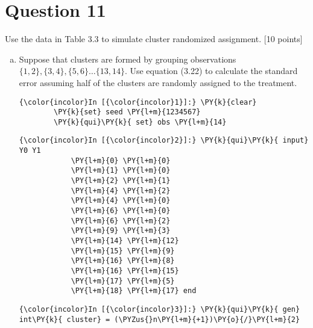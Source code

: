 \documentclass[11pt,notitlepage]{article}\usepackage[]{graphicx}\usepackage[]{color}
\makeatletter
\newenvironment{kframe}{%
 \def\at@end@of@kframe{}%
 \ifinner\ifhmode%
  \def\at@end@of@kframe{\end{minipage}}%
  \begin{minipage}{\columnwidth}%
 \fi\fi%
 \def\FrameCommand##1{\hskip\@totalleftmargin \hskip-\fboxsep
 \colorbox{shadecolor}{##1}\hskip-\fboxsep
     \hskip-\linewidth \hskip-\@totalleftmargin \hskip\columnwidth}%
 \MakeFramed {\advance\hsize-\width
   \@totalleftmargin\z@ \linewidth\hsize
   \@setminipage}}%
 {\par\unskip\endMakeFramed%
 \at@end@of@kframe}
\newenvironment{knitrout}{}{} %
\makeatother
\begin{document}
\section*{Question 11}

Use the data in Table 3.3 to simulate cluster randomized assignment. [10 points]

\begin{enumerate}[a)]
\item Suppose that clusters are formed by grouping observations $\{1,2\},\{3,4\},\{5,6\}\ldots\{13,14\}$.  Use equation (3.22) to calculate the standard error assuming half of the clusters are randomly assigned to the treatment.

\begin{knitrout}
\color{fgcolor}\begin{kframe}
    \begin{Verbatim}[commandchars=\\\{\}]
{\color{incolor}In [{\color{incolor}1}]:} \PY{k}{clear}
        \PY{k}{set} seed \PY{l+m}{1234567}
        \PY{k}{qui}\PY{k}{ set} obs \PY{l+m}{14}
\end{Verbatim}

    \begin{Verbatim}[commandchars=\\\{\}]
{\color{incolor}In [{\color{incolor}2}]:} \PY{k}{qui}\PY{k}{ input} Y0 Y1
        	\PY{l+m}{0} \PY{l+m}{0}
        	\PY{l+m}{1} \PY{l+m}{0}
        	\PY{l+m}{2} \PY{l+m}{1}
        	\PY{l+m}{4} \PY{l+m}{2}
        	\PY{l+m}{4} \PY{l+m}{0}
        	\PY{l+m}{6} \PY{l+m}{0}
        	\PY{l+m}{6} \PY{l+m}{2}
        	\PY{l+m}{9} \PY{l+m}{3}
        	\PY{l+m}{14} \PY{l+m}{12}
        	\PY{l+m}{15} \PY{l+m}{9}
        	\PY{l+m}{16} \PY{l+m}{8}
        	\PY{l+m}{16} \PY{l+m}{15}
        	\PY{l+m}{17} \PY{l+m}{5} 
        	\PY{l+m}{18} \PY{l+m}{17} end
\end{Verbatim}

    \begin{Verbatim}[commandchars=\\\{\}]
{\color{incolor}In [{\color{incolor}3}]:} \PY{k}{qui}\PY{k}{ gen} int\PY{k}{ cluster} = (\PYZus{}n\PY{l+m}{+1})\PY{o}{/}\PY{l+m}{2}
\end{Verbatim}


\end{kframe}
\end{knitrout}
\end{enumerate}
\end{document}
